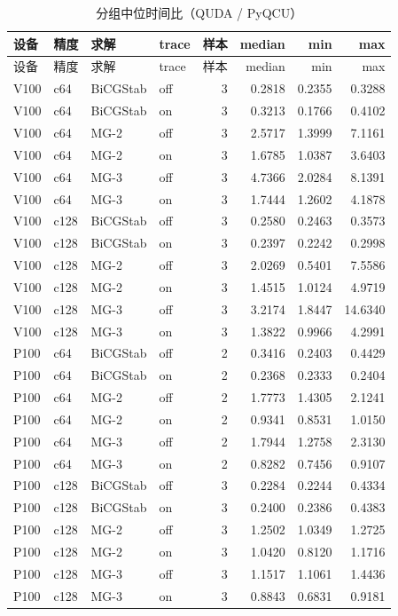 \documentclass[UTF8,a4paper,11pt]{ctexart}
\begin{document}
\begin{longtable}{@{}llllrrrr@{}}
\caption{分组中位时间比（QUDA / PyQCU）}\label{tab:group-ratio}\\
\toprule
设备 & 精度 & 求解 & trace & 样本 & median & min & max \\
\midrule
\endfirsthead
\toprule
设备 & 精度 & 求解 & trace & 样本 & median & min & max \\
\midrule
\endhead
V100 & c64 & BiCGStab & off & 3 & 0.2818 & 0.2355 & 0.3288 \\
V100 & c64 & BiCGStab & on & 3 & 0.3213 & 0.1766 & 0.4102 \\
V100 & c64 & MG-2 & off & 3 & 2.5717 & 1.3999 & 7.1161 \\
V100 & c64 & MG-2 & on & 3 & 1.6785 & 1.0387 & 3.6403 \\
V100 & c64 & MG-3 & off & 3 & 4.7366 & 2.0284 & 8.1391 \\
V100 & c64 & MG-3 & on & 3 & 1.7444 & 1.2602 & 4.1878 \\
V100 & c128 & BiCGStab & off & 3 & 0.2580 & 0.2463 & 0.3573 \\
V100 & c128 & BiCGStab & on & 3 & 0.2397 & 0.2242 & 0.2998 \\
V100 & c128 & MG-2 & off & 3 & 2.0269 & 0.5401 & 7.5586 \\
V100 & c128 & MG-2 & on & 3 & 1.4515 & 1.0124 & 4.9719 \\
V100 & c128 & MG-3 & off & 3 & 3.2174 & 1.8447 & 14.6340 \\
V100 & c128 & MG-3 & on & 3 & 1.3822 & 0.9966 & 4.2991 \\
P100 & c64 & BiCGStab & off & 2 & 0.3416 & 0.2403 & 0.4429 \\
P100 & c64 & BiCGStab & on & 2 & 0.2368 & 0.2333 & 0.2404 \\
P100 & c64 & MG-2 & off & 2 & 1.7773 & 1.4305 & 2.1241 \\
P100 & c64 & MG-2 & on & 2 & 0.9341 & 0.8531 & 1.0150 \\
P100 & c64 & MG-3 & off & 2 & 1.7944 & 1.2758 & 2.3130 \\
P100 & c64 & MG-3 & on & 2 & 0.8282 & 0.7456 & 0.9107 \\
P100 & c128 & BiCGStab & off & 3 & 0.2284 & 0.2244 & 0.4334 \\
P100 & c128 & BiCGStab & on & 3 & 0.2400 & 0.2386 & 0.4383 \\
P100 & c128 & MG-2 & off & 3 & 1.2502 & 1.0349 & 1.2725 \\
P100 & c128 & MG-2 & on & 3 & 1.0420 & 0.8120 & 1.1716 \\
P100 & c128 & MG-3 & off & 3 & 1.1517 & 1.1061 & 1.4436 \\
P100 & c128 & MG-3 & on & 3 & 0.8843 & 0.6831 & 0.9181 \\
\bottomrule
\end{longtable}
\end{document}

